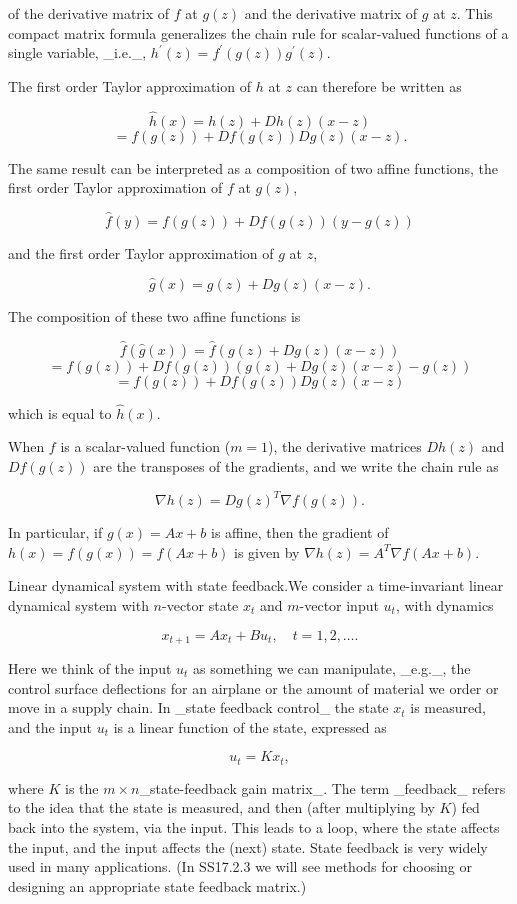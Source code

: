 of the derivative matrix of \(f\) at \(g(z)\) and the derivative matrix of \(g\) at \(z\). This compact matrix formula generalizes the chain rule for scalar-valued functions of a single variable, _i.e._, \(h^{\prime}(z)=f^{\prime}(g(z))g^{\prime}(z)\).

The first order Taylor approximation of \(h\) at \(z\) can therefore be written as

\[\hat{h}(x) = h(z)+Dh(z)(x-z)\] \[= f(g(z))+Df(g(z))Dg(z)(x-z).\]

The same result can be interpreted as a composition of two affine functions, the first order Taylor approximation of \(f\) at \(g(z)\),

\[\hat{f}(y)=f(g(z))+Df(g(z))(y-g(z))\]

and the first order Taylor approximation of \(g\) at \(z\),

\[\hat{g}(x)=g(z)+Dg(z)(x-z).\]

The composition of these two affine functions is

\[\hat{f}(\hat{g}(x)) = \hat{f}(g(z)+Dg(z)(x-z))\] \[= f(g(z))+Df(g(z))(g(z)+Dg(z)(x-z)-g(z))\] \[= f(g(z))+Df(g(z))Dg(z)(x-z)\]

which is equal to \(\hat{h}(x)\).

When \(f\) is a scalar-valued function (\(m=1\)), the derivative matrices \(Dh(z)\) and \(Df(g(z))\) are the transposes of the gradients, and we write the chain rule as

\[\nabla h(z)=Dg(z)^{T}\nabla f(g(z)).\]

In particular, if \(g(x)=Ax+b\) is affine, then the gradient of \(h(x)=f(g(x))=f(Ax+b)\) is given by \(\nabla h(z)=A^{T}\nabla f(Ax+b)\).

Linear dynamical system with state feedback.We consider a time-invariant linear dynamical system with \(n\)-vector state \(x_{t}\) and \(m\)-vector input \(u_{t}\), with dynamics

\[x_{t+1}=Ax_{t}+Bu_{t},\quad t=1,2,\ldots.\]

Here we think of the input \(u_{t}\) as something we can manipulate, _e.g._, the control surface deflections for an airplane or the amount of material we order or move in a supply chain. In _state feedback control_ the state \(x_{t}\) is measured, and the input \(u_{t}\) is a linear function of the state, expressed as

\[u_{t}=Kx_{t},\]

where \(K\) is the \(m\times n\)_state-feedback gain matrix_. The term _feedback_ refers to the idea that the state is measured, and then (after multiplying by \(K\)) fed back into the system, via the input. This leads to a loop, where the state affects the input, and the input affects the (next) state. State feedback is very widely used in many applications. (In SS17.2.3 we will see methods for choosing or designing an appropriate state feedback matrix.) 
